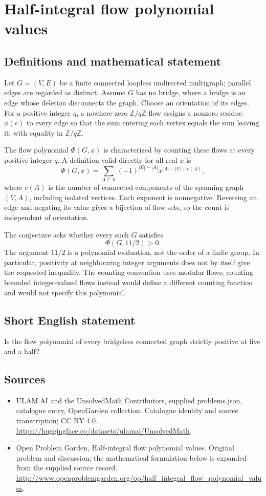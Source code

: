 \documentclass[11pt,a4paper]{article}
\begin{document}
\section*{Half-integral flow polynomial values}\label{statement}

\subsection{Definitions and mathematical statement}
Let $G=(V,E)$ be a finite connected loopless undirected multigraph;
parallel edges are regarded as distinct. Assume $G$ has no bridge,
where a bridge is an edge whose deletion disconnects the graph.
Choose an orientation of its edges. For a positive integer $q$, a
nowhere-zero $\mathbb Z/q\mathbb Z$-flow assigns a nonzero residue
$\phi(e)$ to every edge so that the sum entering each vertex equals
the sum leaving it, with equality in $\mathbb Z/q\mathbb Z$.

The flow polynomial $\Phi(G,x)$ is characterized by counting these
flows at every positive integer $q$. A definition valid directly
for all real $x$ is
\[
 \Phi(G,x)=\sum_{A\subseteq E}(-1)^{|E|-|A|}
 x^{|A|-|V|+c(A)},
\]
where $c(A)$ is the number of connected components of the spanning
graph $(V,A)$, including isolated vertices. Each exponent is
nonnegative. Reversing an edge and negating its value gives a
bijection of flow sets, so the count is independent of orientation.

The conjecture asks whether every such $G$ satisfies
\[
 \Phi(G,11/2)>0.
\]
The argument $11/2$ is a polynomial evaluation, not the order of
a finite group. In particular, positivity at neighbouring integer
arguments does not by itself give the requested inequality.
The counting convention uses modular flows; counting bounded
integer-valued flows instead would define a different counting
function and would not specify this polynomial.
\subsection{Short English statement}
Is the flow polynomial of every bridgeless connected graph strictly positive at five and a half?
\subsection{Sources}
\begin{itemize}
\item[S1] ULAM.AI and the UnsolvedMath Contributors, supplied problems.json, catalogue entry, OpenGarden collection. Catalogue identity and source transcription; CC BY 4.0.
\url{https://huggingface.co/datasets/ulamai/UnsolvedMath}.
\item[S2] Open Problem Garden, Half-integral flow polynomial values. Original problem and discussion; the mathematical formulation below is expanded from the supplied source record.
\url{http://www.openproblemgarden.org/op/half_integral_flow_polynomial_values}.
\end{itemize}
\end{document}
